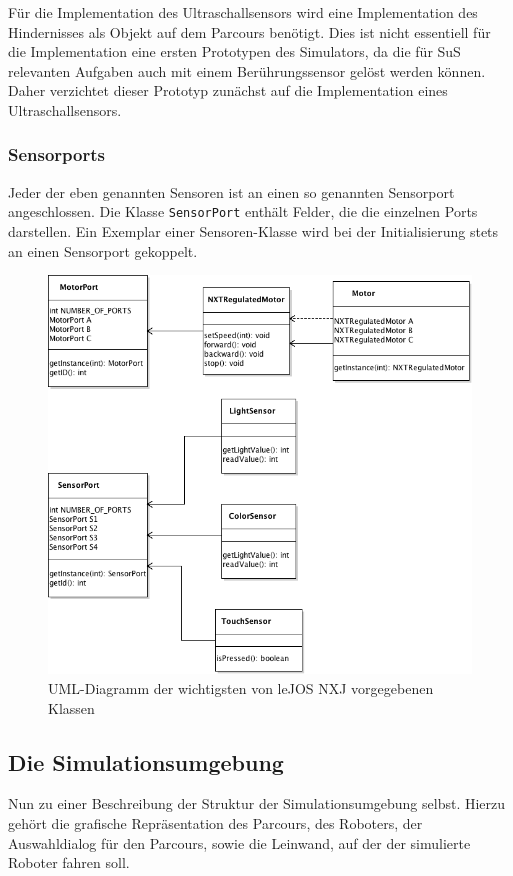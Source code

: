 \documentclass[paper=a4, pagesize, DIV=calc, BCOR=15.5mm, twoside=on, onecolumn=on, open = right, titlepage =on, parskip =half-, headsepline = on, footsepline = on, chapterprefix = on, appendixprefix = off, fontsize = 12pt, numbers = noenddot, abstract = on]{scrbook}
\numberwithin{equation}{chapter}
\theoremstyle{definition}
\theoremstyle{plain}
\theoremstyle{plain}
\theoremstyle{remark}
\theoremstyle{plain}
\theoremstyle{plain}
\begin{document}
Für die Implementation des Ultraschallsensors wird eine Implementation des Hindernisses als Objekt auf dem Parcours benötigt. Dies ist nicht essentiell für die Implementation eine ersten Prototypen des Simulators, da die für SuS relevanten Aufgaben auch mit einem Berührungssensor gelöst werden können. Daher verzichtet dieser Prototyp zunächst auf die Implementation eines Ultraschallsensors.

\subsubsection{Sensorports}
Jeder der eben genannten Sensoren ist an einen so genannten Sensorport angeschlossen. Die Klasse \texttt{SensorPort} enthält Felder, die die einzelnen Ports darstellen. Ein Exemplar einer Sensoren-Klasse wird bei der Initialisierung stets an einen Sensorport gekoppelt. 

\begin{figure}[htpb]
\centering
\includegraphics[scale=0.65]{images/uml_api_essenz.png}
\caption{UML-Diagramm der wichtigsten von leJOS NXJ vorgegebenen Klassen}
\label{fig:api_uml}
\end{figure}

\par \singlespacing
\subsection{Die Simulationsumgebung}
\onehalfspacing
Nun zu einer Beschreibung der Struktur der Simulationsumgebung selbst. Hierzu gehört die grafische Repräsentation des Parcours, des Roboters, der Auswahldialog für den Parcours, sowie die Leinwand, auf der der simulierte Roboter fahren soll.
\end{document}
